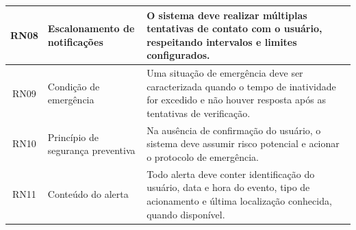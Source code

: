\begin{table}[H]
\begin{tabular}{|c|p{4cm}|p{8cm}|}
RN08 & Escalonamento de notificações &
O sistema deve realizar múltiplas tentativas de contato com o usuário, respeitando intervalos e limites configurados. \\
\hline

RN09 & Condição de emergência &
Uma situação de emergência deve ser caracterizada quando o tempo de inatividade for excedido e não houver resposta após as tentativas de verificação. \\
\hline

RN10 & Princípio de segurança preventiva &
Na ausência de confirmação do usuário, o sistema deve assumir risco potencial e acionar o protocolo de emergência. \\
\hline

RN11 & Conteúdo do alerta &
Todo alerta deve conter identificação do usuário, data e hora do evento, tipo de acionamento e última localização conhecida, quando disponível. \\
\hline

\end{tabular}

\end{table}

